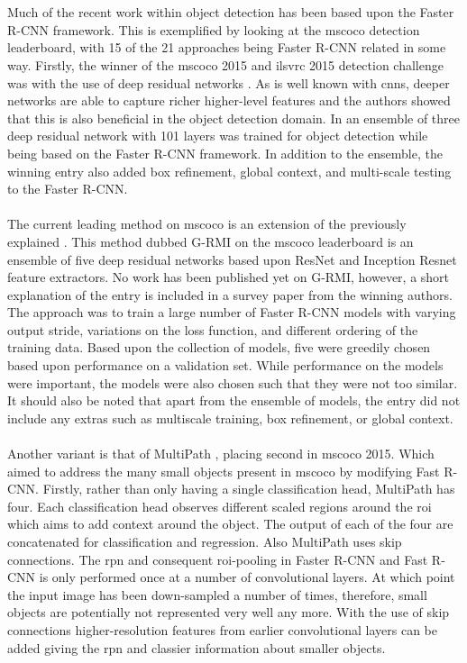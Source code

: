 \\\\
Much of the recent work within object detection has been based upon the Faster R-CNN framework. This is exemplified by looking at the \gls{mscoco} detection leaderboard, with 15 of the 21 approaches being Faster R-CNN related in some way. Firstly, the winner of the \gls{mscoco} 2015 and \gls{ilsvrc} 2015 detection challenge was with the use of deep residual networks \cite{deepres}. As is well known with \glspl{cnn}, deeper networks are able to capture richer higher-level features and the authors showed that this is also beneficial in the object detection domain. In \cite{deepres} an ensemble of three deep residual network with 101 layers was trained for object detection while being based on the Faster R-CNN framework. In addition to the ensemble, the winning entry also added box refinement, global context, and multi-scale testing to the Faster R-CNN.
\\\\
The current leading method on \gls{mscoco} is an extension of the previously explained \cite{deepres}. This method dubbed G-RMI on the \gls{mscoco} leaderboard \cite{cocolead} is an ensemble of five deep residual networks based upon ResNet \cite{deepres} and Inception Resnet \cite{incepres} feature extractors. No work has been published yet on G-RMI, however, a short explanation of the entry is included in a survey paper \cite{speedacc} from the winning authors. The approach was to train a large number of Faster R-CNN models with varying output stride, variations on the loss function, and different ordering of the training data. Based upon the collection of models, five were greedily chosen based upon performance on a validation set. While performance on the models were important, the models were also chosen such that they were not too similar. It should also be noted that apart from the ensemble of models, the entry did not include any extras such as multiscale training, box refinement, or global context.
\\\\
Another variant is that of MultiPath \cite{multipath}, placing second in \gls{mscoco} 2015. Which aimed to address the many small objects present in \gls{mscoco} by modifying Fast R-CNN. Firstly, rather than only having a single classification head, MultiPath has four. Each classification head observes different scaled regions around the \gls{roi} which aims to add context around the object. The output of each of the four are concatenated for classification and regression. Also MultiPath uses skip connections. The \gls{rpn} and consequent \gls{roi}-pooling in Faster R-CNN and Fast R-CNN is only performed once at a number of convolutional layers. At which point the input image has been down-sampled a number of times, therefore, small objects are potentially not represented very well any more. With the use of skip connections higher-resolution features from earlier convolutional layers can be added giving the \gls{rpn} and classier information about smaller objects.
